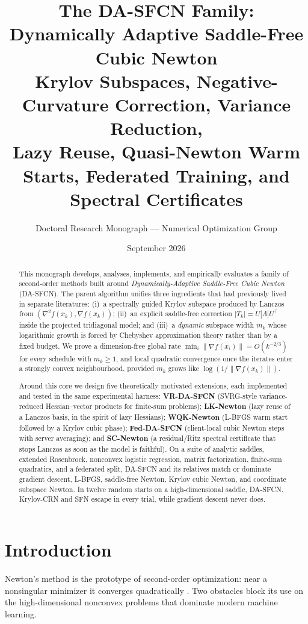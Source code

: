 \documentclass[11pt,a4paper]{article}
\title{\textbf{The DA-SFCN Family: Dynamically Adaptive Saddle-Free Cubic Newton}\\[4pt]
\large Krylov Subspaces, Negative-Curvature Correction, Variance Reduction,\\
Lazy Reuse, Quasi-Newton Warm Starts, Federated Training, and Spectral Certificates}
\author{Doctoral Research Monograph --- Numerical Optimization Group}
\date{September 2026}
\theoremstyle{definition}
\begin{document}
\maketitle

\begin{abstract}
This monograph develops, analyses, implements, and empirically evaluates a
family of second-order methods built around
\emph{Dynamically-Adaptive Saddle-Free Cubic Newton} (DA-SFCN).
The parent algorithm unifies three ingredients that had previously lived in
separate literatures: (i)~a spectrally guided Krylov subspace produced by
Lanczos from $(\nabla^2 f(x_k),\nabla f(x_k))$; (ii)~an explicit saddle-free
correction $|T_k|=U|\Lambda|U^\top$ inside the projected tridiagonal model;
and (iii)~a \emph{dynamic} subspace width $m_k$ whose logarithmic growth is
forced by Chebyshev approximation theory rather than by a fixed budget.
We prove a dimension-free global rate
$\min_i\|\nabla f(x_i)\|=O(k^{-2/3})$ for every schedule with $m_k\ge 1$,
and local quadratic convergence once the iterates enter a strongly convex
neighbourhood, provided $m_k$ grows like $\log(1/\|\nabla f(x_k)\|)$.

Around this core we design five theoretically motivated extensions, each
implemented and tested in the same experimental harness:
\textbf{VR-DA-SFCN} (SVRG-style variance-reduced Hessian--vector products for
finite-sum problems);
\textbf{LK-Newton} (lazy reuse of a Lanczos basis, in the spirit of lazy
Hessians);
\textbf{WQK-Newton} (L-BFGS warm start followed by a Krylov cubic phase);
\textbf{Fed-DA-SFCN} (client-local cubic Newton steps with server averaging);
and \textbf{SC-Newton} (a residual/Ritz spectral certificate that stops
Lanczos as soon as the model is faithful).
On a suite of analytic saddles, extended Rosenbrock, nonconvex logistic
regression, matrix factorization, finite-sum quadratics, and a federated
split, DA-SFCN and its relatives match or dominate gradient descent,
L-BFGS, saddle-free Newton, Krylov cubic Newton, and coordinate subspace
Newton. In twelve random starts on a high-dimensional saddle,
DA-SFCN, Krylov-CRN and SFN escape in every trial, while gradient descent
never does.
\end{abstract}

\tableofcontents
\vspace{1em}

\section{Introduction}
Newton's method is the prototype of second-order optimization: near a
nonsingular minimizer it converges quadratically
\cite{nocedal2006,dembo1982}. Two obstacles block its use on the
high-dimensional nonconvex problems that dominate modern machine learning.
\end{document}
